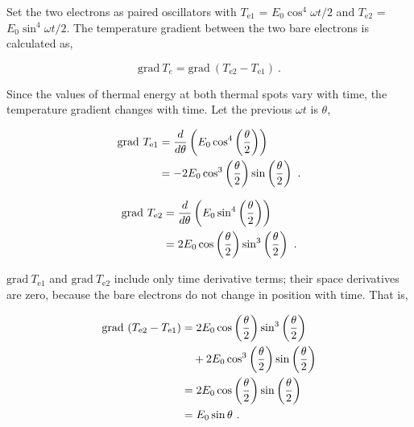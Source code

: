 \documentclass[%
 reprint,
 amsmath,amssymb,
 aps,
]{revtex4-1}
\numberwithin{equation}{section}%
\begin{document}
    Set the two electrons as paired oscillators with $T_{\mathrm{e1}}$ = $E_{0} \cos^{4} \omega t /2$ and $T_{\mathrm{e2}}$ = $E_{0} \sin^{4} \omega t /2$. The temperature gradient between the two bare electrons is calculated as,

    \begin{equation}
            \mathrm{grad} \ T_e = \mathrm{grad} \ ( T_{\mathrm{e2}} - T_{\mathrm{e1}} )
            \ .
            \label{e3_k_grad_Te2-Te1}
    \end{equation}


    Since the values of thermal energy at both thermal spots vary with time, the temperature gradient changes with time. Let the previous $\omega t$ is $\theta$,


        \begin{align}
            \mathrm{grad} \ T_{\mathrm{e1}}
                &= \frac{d}{d \theta} \left( E_{0} \cos^{4} \left( \frac{\theta}{2} \right) \right) \notag \\
                &= - 2 E_{0} \cos^{3} \left( \frac{\theta}{2} \right) \sin \left( \frac{\theta}{2} \right)
                \ .
                \label{e3_gradT_e1}
        \end{align}

        \begin{align}
            \mathrm{grad} \ T_{\mathrm{e2}}
                &= \frac{d}{d \theta} \left( E_{0} \sin^{4} \left( \frac{\theta}{2} \right) \right) \notag \\
                &=   2 E_{0} \cos \left( \frac{\theta}{2} \right) \sin^{3} \left( \frac{\theta}{2} \right)
                \ .
                \label{e3_gradT_e2}
        \end{align}        


    $\mathrm{grad} \ T_{\mathrm{e1}}$ and $\mathrm{grad} \ T_{\mathrm{e2}}$ include only time derivative terms; their space derivatives are zero, because the bare electrons do not change in position with time. That is,


        \begin{align}
            \mathrm{grad} \ (T_{\mathrm{e2}} - T_{\mathrm{e1}})
                &= 2 E_{0} \cos \left( \frac{\theta}{2} \right) \sin^{3} \left( \frac{\theta}{2} \right) \notag \\
                & \quad + 2 E_{0} \cos^{3} \left( \frac{\theta}{2} \right) \sin \left( \frac{\theta}{2} \right) \notag \\
                &= 2 E_{0} \cos \left( \frac{\theta}{2} \right) \sin \left( \frac{\theta}{2} \right) \notag \\
                &= E_{0} \sin \theta
                \ .
            \label{e3_simple_harmonic_motion}
        \end{align}
\end{document}
